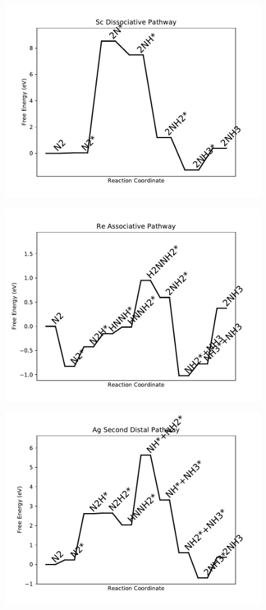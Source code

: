 \begin{figure}
\centering
\includegraphics[width=0.8\linewidth]{data/plots/Sc_dissociative.pdf}
\end{figure}

\begin{figure}
\centering
\includegraphics[width=0.8\linewidth]{data/plots/Re_associative.pdf}
\end{figure}

\begin{figure}
\centering
\includegraphics[width=0.8\linewidth]{data/plots/Ag_distal_2.pdf}
\end{figure}

